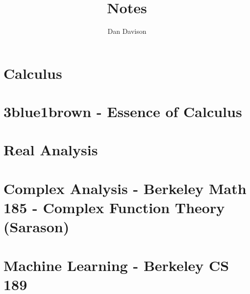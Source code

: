 \documentclass{book}
\title{Notes}
\author{Dan Davison}
\begin{document}
\frontmatter
\maketitle
\tableofcontents
\mainmatter
\chapter{Calculus}


\chapter{3blue1brown - Essence of Calculus}


\chapter{Real Analysis}


\chapter{Complex Analysis - Berkeley Math 185 - Complex Function Theory (Sarason)}


\chapter{Machine Learning - Berkeley CS 189}


\end{document}
